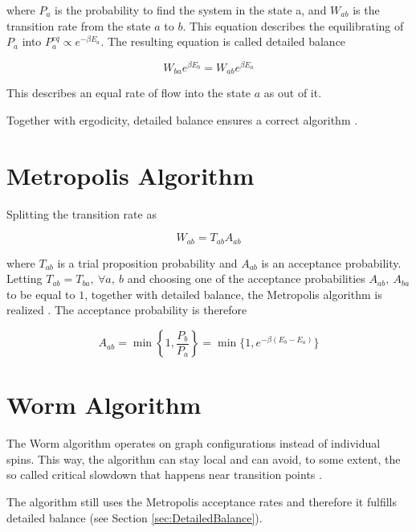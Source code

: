 where $P_a$ is the probability to find the system in the state a, and $W_{ab}$ is the transition rate from the state $a$ to $b$. This equation describes the equilibrating of $P_a$ into $P_a^{eq} \propto e^{-\beta E_a}$. The resulting equation is called detailed balance

\begin{equation}
    W_{ba} e^{\beta E_b} = W_{ab} e^{\beta E_a}
\end{equation}

This describes an equal rate of flow into the state $a$ as out of it.

Together with ergodicity, detailed balance ensures a correct algorithm \cite{Walter:IntroToMC}.

\section{Metropolis Algorithm}
\label{sec:MetropolisAlgorithm}

Splitting the transition rate as

\begin{equation}
    W_{ab} = T_{ab} A_{ab}
\end{equation}

where $T_{ab}$ is a trial proposition probability and $A_{ab}$ is an acceptance probability. Letting $T_{ab} = T_{ba}, \ \forall a, \ b$ and choosing one of the acceptance probabilities $A_{ab}, \ A_{ba}$ to be equal to $1$, together with detailed balance, the Metropolis algorithm is realized \cite{Walter:IntroToMC}. The acceptance probability is therefore

\begin{equation}
    A_{ab} = \min \left \{ 1, \frac{P_b}{P_a} \right \} = \min \{ 1, e^{-\beta(E_b - E_a )} \}
\end{equation}


\section{Worm Algorithm}
\label{sec:WormAlgorithm}

The Worm algorithm operates on graph configurations instead of individual spins. This way, the algorithm can stay local and can avoid, to some extent, the so called critical slowdown that happens near transition points \cite{Prokofev:first_worm_algorithm}.

The algorithm still uses the Metropolis acceptance rates and therefore it fulfills detailed balance (see Section \ref{sec:DetailedBalance}).

